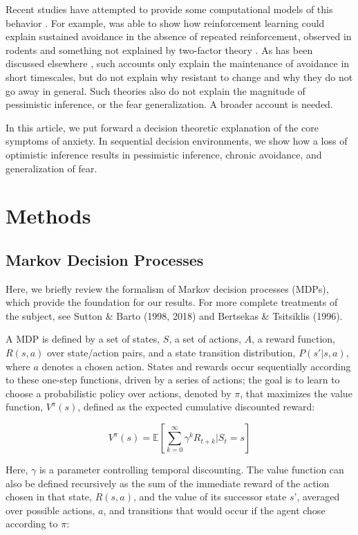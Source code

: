 \documentclass[11pt]{article} %
\begin{document}
Recent studies have attempted to provide some computational models of this behavior
\cite{Moutoussis2008, Maia2010}. For example, \cite{Maia2010} was able to show
how reinforcement learning could explain sustained avoidance in the absence of
repeated reinforcement, observed in rodents \cite{servatius2008} and something
not explained by two-factor theory \cite{Krypotos2015}. As has been discussed
elsewhere \cite{Moutoussis2017}, such accounts only explain the maintenance of
avoidance in short timescales, but do not explain why resistant to change and
why they do not go away in general. Such theories also do not explain the magnitude
of pessimistic inference, or the fear generalization. A broader account is needed.

In this article, we put forward a decision theoretic explanation of the core
symptoms of anxiety. In sequential decision environments, we show how a loss of
optimistic inference results in pessimistic inference, chronic avoidance, and
generalization of fear.

\section{Methods}

\subsection{Markov Decision Processes}

Here, we briefly review the formalism of Markov decision processes (MDPs), which
provide the foundation for our results. For more complete treatments of the
subject, see Sutton \& Barto (1998, 2018) and Bertsekas \& Tsitsiklis (1996).

A MDP is defined by a set of states, $S$, a set of actions, $A$, a reward
function, $R(s,a)$ over state/action pairs, and a state transition distribution,
$P(s'|s,a)$, where $a$ denotes a chosen action. States and rewards occur
sequentially according to these one-step functions, driven by a series of
actions; the goal is to learn to choose a probabilistic policy over actions,
denoted by $\pi$, that maximizes the value function, $V^\pi(s)$, defined as the
expected cumulative discounted reward:

$$ V^\pi(s) = \mathbb{E} \left[ \sum^{\infty}_{k=0} \gamma^k R_{t+k} | S_t = s \right] $$

Here, $\gamma$ is a parameter controlling temporal discounting. The value function
can also be defined recursively as the sum of the immediate reward of the action
chosen in that state, $R(s, a)$, and the value of its successor state $s’$,
averaged over possible actions, $a$, and transitions that would occur if the agent
chose according to $\pi$:
\end{document}
